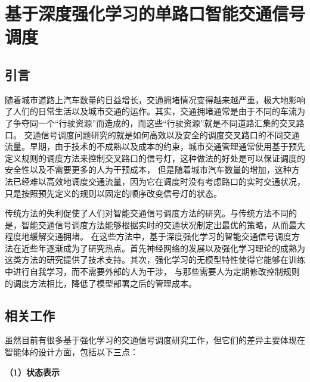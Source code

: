 
\chapter{基于深度强化学习的单路口智能交通信号调度}
\section{引言}
随着城市道路上汽车数量的日益增长，交通拥堵情况变得越来越严重，极大地影响了人们的日常生活以及城市交通的运作。其实，交通拥堵通常是由于不同的车流为了争夺同一个“行驶资源”而造成的，而这些“行驶资源”就是不同道路汇集的交叉路口。
交通信号调度问题研究的就是如何高效以及安全的调度交叉路口的不同交通流量。早期，由于技术的不成熟以及成本的约束，城市交通管理通常使用基于预先定义规则的调度方法来控制交叉路口的信号灯，这种做法的好处是可以保证调度的安全性以及不需要更多的人为干预成本，
但是随着城市汽车数量的增加，这种方法已经难以高效地调度交通流量，因为它在调度时没有考虑路口的实时交通状况，只是按照预先定义的规则以固定的顺序改变信号灯的状态。

传统方法的失利促使了人们对智能交通信号调度方法的研究。与传统方法不同的是，智能交通信号调度方法能够根据实时的交通状况制定出最优的策略，从而最大程度地缓解交通拥堵。
在这些方法中，基于深度强化学习的智能交通信号调度方法在近些年逐渐成为了研究热点。首先神经网络的发展以及强化学习理论的成熟为这类方法的研究提供了技术支持。其次，强化学习的无模型特性使得它能够在训练中进行自我学习，而不需要外部的人为干涉，
与那些需要人为定期修改控制规则的调度方法相比，降低了模型部署之后的管理成本。

\section{相关工作}
虽然目前有很多基于强化学习的交通信号调度研究工作，但它们的差异主要体现在智能体的设计方面，包括以下三点：

\textbf{（1）状态表示}

